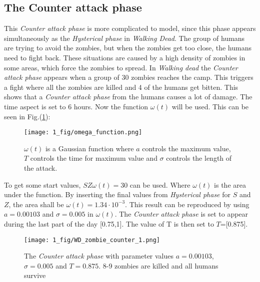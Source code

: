 \documentclass[%
twoside,                 %
final,                   %
chapterprefix=true,      %
open=right               %
10pt]{book}
\begin{document}
\subsection{The Counter attack phase}
\label{section:counter_attack}
This \emph{Counter attack phase} is more complicated to model, since this phase appears simultaneously as the \emph{Hysterical phase} in \emph{Walking Dead}. The group of humans are trying to avoid the zombies, but when the zombies get too close, the humans need to fight back. These situations are caused by a high density of zombies in some areas, which force the zombies to spread. In \emph{Walking dead} the \emph{Counter attack phase} appears when a group of 30 zombies reaches the camp. This triggers a fight where all the zombies are killed and 4 of the humans get bitten. This shows that a \emph{Counter attack phase} from the humans causes a lot of damage. The time aspect is set to 6 hours. Now the function $\omega(t)$ will be used. This can be seen in Fig.(\ref{fig:omega_function}):


\vspace{3mm}




\vspace{3mm}




\begin{figure}[ht]
  \centerline{\texttt{[image: 1\_fig/omega\_function.png]}}
  \caption{
  \label{fig:omega_function} $\omega (t)$ is a Gaussian function where $a$ controls the maximum value, $T$ controls the time for maximum value and $\sigma$ controls the length of the attack.
  }
\end{figure}


To get some start values, $SZ\omega(t)=30$ can be used. Where $\omega(t)$ is the area under the function. By inserting the final values from \emph{Hysterical phase} for $S$ and $Z$, the area shall be $\omega (t)=1.34\cdot10^{-3}$. This result can be reproduced by using $a= 0.00103$ and $\sigma = 0.005$ in $\omega(t)$. The \emph{Counter attack phase} is set to appear during the last part of the day [0.75,1]. The value of T is then set to $T$=[0.875].


\vspace{3mm}




\vspace{3mm}




\begin{figure}[ht]
  \centerline{\texttt{[image: 1\_fig/WD\_zombie\_counter\_1.png]}}
  \caption{
  \label{fig:zombie_counter_1} The \emph{Counter attack phase} with parameter values $a = 0.00103$, $\sigma = 0.005$ and $T = 0.875$. 8-9 zombies are killed and all humans survive
  }
\end{figure}
\end{document}
